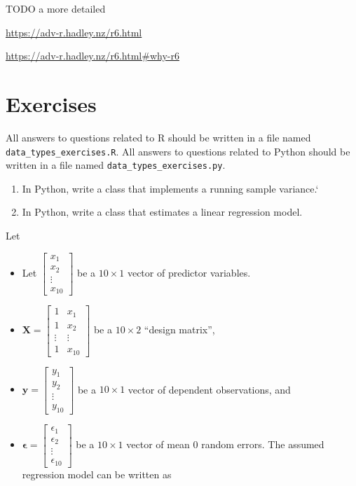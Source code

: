 \documentclass[
  12pt,
  krantz2]{krantz}
\providecommand{\tightlist}{%
  \setlength{\itemsep}{0pt}\setlength{\parskip}{0pt}}
\begin{document}
TODO
a more detailed

\url{https://adv-r.hadley.nz/r6.html}

\url{https://adv-r.hadley.nz/r6.html\#why-r6}

\hypertarget{exercises-10}{%
\section{Exercises}\label{exercises-10}}

All answers to questions related to R should be written in a file named \texttt{data\_types\_exercises.R}. All answers to questions related to Python should be written in a file named \texttt{data\_types\_exercises.py}.

\begin{enumerate}
\def\labelenumi{\arabic{enumi}.}
\item
  In Python, write a class that implements a running sample variance.`
\item
  In Python, write a class that estimates a linear regression model.
\end{enumerate}

Let

\begin{itemize}
\tightlist
\item
  Let \(\begin{bmatrix}x_1 \\ x_2 \\ \vdots \\ x_{10} \end{bmatrix}\) be a \(10 \times 1\) vector of predictor variables.
\item
  \(\mathbf{X} = \begin{bmatrix} 1 & x_1 \\ 1 & x_2 \\ \vdots & \vdots \\ 1 & x_{10} \end{bmatrix}\) be a \(10 \times 2\) ``design matrix'',
\item
  \(\mathbf{y} = \begin{bmatrix} y_1 \\ y_2 \\ \vdots \\ y_{10} \end{bmatrix}\) be a \(10 \times 1\) vector of dependent observations, and
\item
  \(\boldsymbol{\epsilon} = \begin{bmatrix} \epsilon_1 \\ \epsilon_2 \\ \vdots \\ \epsilon_{10} \end{bmatrix}\) be a \(10 \times 1\) vector of mean \(0\) random errors. The assumed regression model can be written as
\end{itemize}
\end{document}
